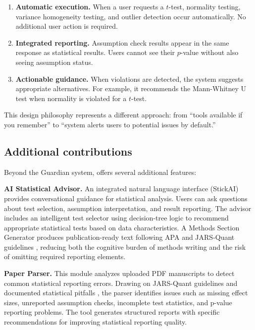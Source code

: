 \documentclass[article]{jss}
\begin{document}
\begin{enumerate}
\item \textbf{Automatic execution.} When a user requests a $t$-test, normality testing, variance homogeneity testing, and outlier detection occur automatically. No additional user action is required.
\item \textbf{Integrated reporting.} Assumption check results appear in the same response as statistical results. Users cannot see their $p$-value without also seeing assumption status.
\item \textbf{Actionable guidance.} When violations are detected, the system suggests appropriate alternatives. For example, it recommends the Mann-Whitney U test when normality is violated for a $t$-test.
\end{enumerate}

This design philosophy represents a different approach: from ``tools available if you remember'' to ``system alerts users to potential issues by default.''

\subsection{Additional contributions}

Beyond the Guardian system,  offers several additional features:

\textbf{AI Statistical Advisor.} An integrated natural language interface (StickAI) provides conversational guidance for statistical analysis. Users can ask questions about test selection, assumption interpretation, and result reporting. The advisor includes an intelligent test selector using decision-tree logic to recommend appropriate statistical tests based on data characteristics. A Methods Section Generator produces publication-ready text following APA and JARS-Quant guidelines \citep{appelbaum2018jars}, reducing both the cognitive burden of methods writing and the risk of omitting required reporting elements.

\textbf{Paper Parser.} This module analyzes uploaded PDF manuscripts to detect common statistical reporting errors. Drawing on JARS-Quant guidelines and documented statistical pitfalls \citep{appelbaum2018jars, keselman1998statistical}, the parser identifies issues such as missing effect sizes, unreported assumption checks, incomplete test statistics, and p-value reporting problems. The tool generates structured reports with specific recommendations for improving statistical reporting quality.
\end{document}
